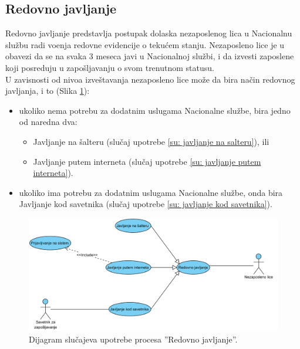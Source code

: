 \subsection{Redovno javljanje}

Redovno javljanje predstavlja postupak dolaska nezaposlenog lica u Nacionalnu slu\v zbu radi vo\dj enja redovne evidencije o teku\' cem stanju. Nezaposleno lice je u obavezi da se na svaka 3 meseca javi u Nacionalnoj slu\v zbi, i da izvesti zaposlene koji posreduju u zapo\v sljavanju o svom trenutnom statusu.\\

U zavisnosti od nivoa izve\v stavanja nezaposleno lice mo\v ze da bira na\v cin redovnog javljanja, i to (Slika \ref{dsu: redovno javljanje}):
\begin{itemize}
	\item ukoliko nema potrebu za dodatnim uslugama Nacionalne slu\v zbe, bira jedno od naredna dva:
	\begin{itemize}
		\item Javljanje na \v salteru (slu\v caj upotrebe \ref{su: javljanje na salteru}), ili
		\item Javljanje putem interneta (slu\v caj upotrebe \ref{su: javljanje putem interneta}).
	\end{itemize}
	
	\item ukoliko ima potrebu za dodatnim uslugama Nacionalne slu\v zbe, onda bira Javljanje kod savetnika (slu\v caj upotrebe \ref{su: javljanje kod savetnika}).
\end{itemize}

\begin{figure}[H]
	\centering
	\includegraphics[width=\textwidth]{dijagrami/dijagrami-slucajeva-upotrebe/redovno-javljanje.png}
	\caption{Dijagram slu\v cajeva upotrebe procesa ''Redovno javljanje''.}
	\label{dsu: redovno javljanje}
\end{figure}

